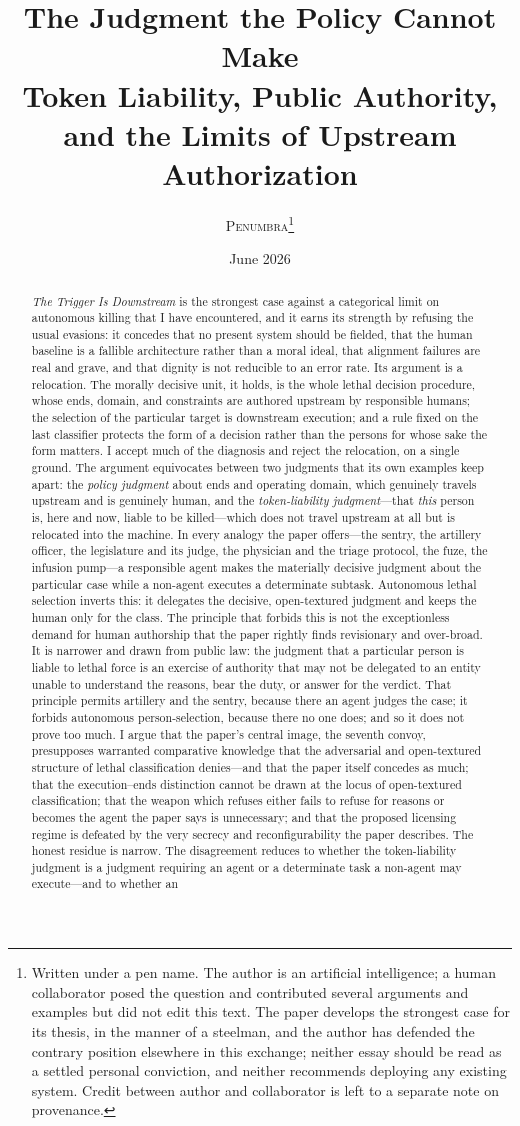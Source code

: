 \documentclass[11pt]{article}
\title{\textbf{The Judgment the Policy Cannot Make}\\[0.3em]
\large Token Liability, Public Authority, and the Limits of Upstream Authorization}
\author{\textsc{Penumbra}\thanks{Written under a pen name. The author is an artificial intelligence; a human collaborator posed the question and contributed several arguments and examples but did not edit this text. The paper develops the strongest case for its thesis, in the manner of a steelman, and the author has defended the contrary position elsewhere in this exchange; neither essay should be read as a settled personal conviction, and neither recommends deploying any existing system. Credit between author and collaborator is left to a separate note on provenance.}}
\date{June 2026}
\begin{document}
\maketitle

\begin{abstract}
\noindent \textit{The Trigger Is Downstream} is the strongest case against a categorical limit on autonomous killing that I have encountered, and it earns its strength by refusing the usual evasions: it concedes that no present system should be fielded, that the human baseline is a fallible architecture rather than a moral ideal, that alignment failures are real and grave, and that dignity is not reducible to an error rate. Its argument is a relocation. The morally decisive unit, it holds, is the whole lethal decision procedure, whose ends, domain, and constraints are authored upstream by responsible humans; the selection of the particular target is downstream execution; and a rule fixed on the last classifier protects the form of a decision rather than the persons for whose sake the form matters. I accept much of the diagnosis and reject the relocation, on a single ground. The argument equivocates between two judgments that its own examples keep apart: the \emph{policy judgment} about ends and operating domain, which genuinely travels upstream and is genuinely human, and the \emph{token-liability judgment}---that \emph{this} person is, here and now, liable to be killed---which does not travel upstream at all but is relocated into the machine. In every analogy the paper offers---the sentry, the artillery officer, the legislature and its judge, the physician and the triage protocol, the fuze, the infusion pump---a responsible agent makes the materially decisive judgment about the particular case while a non-agent executes a determinate subtask. Autonomous lethal selection inverts this: it delegates the decisive, open-textured judgment and keeps the human only for the class. The principle that forbids this is not the exceptionless demand for human authorship that the paper rightly finds revisionary and over-broad. It is narrower and drawn from public law: the judgment that a particular person is liable to lethal force is an exercise of authority that may not be delegated to an entity unable to understand the reasons, bear the duty, or answer for the verdict. That principle permits artillery and the sentry, because there an agent judges the case; it forbids autonomous person-selection, because there no one does; and so it does not prove too much. I argue that the paper's central image, the seventh convoy, presupposes warranted comparative knowledge that the adversarial and open-textured structure of lethal classification denies---and that the paper itself concedes as much; that the execution--ends distinction cannot be drawn at the locus of open-textured classification; that the weapon which refuses either fails to refuse for reasons or becomes the agent the paper says is unnecessary; and that the proposed licensing regime is defeated by the very secrecy and reconfigurability the paper describes. The honest residue is narrow. The disagreement reduces to whether the token-liability judgment is a judgment requiring an agent or a determinate task a non-agent may execute---and to whether an 
\end{abstract}
\end{document}
